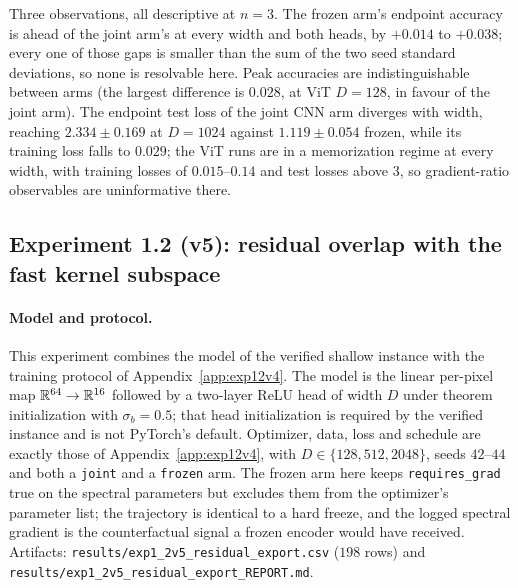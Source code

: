 Three observations, all descriptive at $n = 3$. The frozen arm's endpoint
accuracy is ahead of the joint arm's at every width and both heads, by
$+0.014$ to $+0.038$; every one of those gaps is smaller than the sum of the
two seed standard deviations, so none is resolvable here. Peak accuracies are
indistinguishable between arms (the largest difference is $0.028$, at ViT
$D = 128$, in favour of the joint arm). The endpoint test loss of the joint
CNN arm diverges with width, reaching $2.334 \pm 0.169$ at $D = 1024$ against
$1.119 \pm 0.054$ frozen, while its training loss falls to $0.029$; the ViT
runs are in a memorization regime at every width, with training losses of
$0.015$--$0.14$ and test losses above $3$, so gradient-ratio observables are
uninformative there.

\subsection{Experiment 1.2 (v5): residual overlap with the fast kernel subspace}
\label{app:exp12v5}

\paragraph{Model and protocol.} This experiment combines the model of the
verified shallow instance with the training protocol of
Appendix~\ref{app:exp12v4}. The model is the linear per-pixel map
$\mathbb{R}^{64} \to \mathbb{R}^{16}$ followed by a two-layer ReLU head of width $D$ under
theorem initialization with $\sigma_b = 0.5$; that head initialization is
required by the verified instance and is not PyTorch's default. Optimizer,
data, loss and schedule are exactly those of Appendix~\ref{app:exp12v4}, with
$D \in \{128, 512, 2048\}$, seeds $42$--$44$ and both a \texttt{joint} and a
\texttt{frozen} arm. The frozen arm here keeps \texttt{requires\_grad} true on
the spectral parameters but excludes them from the optimizer's parameter list;
the trajectory is identical to a hard freeze, and the logged spectral gradient
is the counterfactual signal a frozen encoder would have received. Artifacts:
\texttt{results/exp1\_2v5\_residual\_export.csv} ($198$ rows) and
\texttt{results/exp1\_2v5\_residual\_export\_REPORT.md}.

